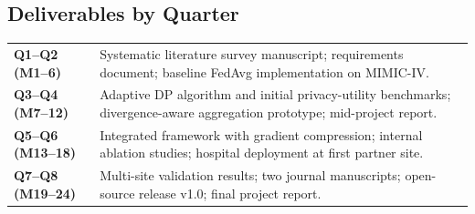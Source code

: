 \subsection{Deliverables by Quarter}

\begin{tabularx}{\textwidth}{@{}>{\color{accent}\bfseries}l@{\hspace{6mm}}X@{}}
  Q1--Q2 (M1--6)  & Systematic literature survey manuscript; requirements document;
                     baseline FedAvg implementation on MIMIC-IV. \\
  Q3--Q4 (M7--12) & Adaptive DP algorithm and initial privacy-utility benchmarks;
                     divergence-aware aggregation prototype; mid-project report. \\
  Q5--Q6 (M13--18)& Integrated framework with gradient compression; internal
                     ablation studies; hospital deployment at first partner site. \\
  Q7--Q8 (M19--24)& Multi-site validation results; two journal manuscripts;
                     open-source release v1.0; final project report. \\
\end{tabularx}

